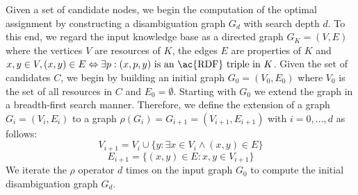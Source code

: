 Given a set of candidate nodes, we begin the computation of the optimal assignment by constructing a disambiguation graph $G_d$ with search depth $d$.
To this end, we regard the input knowledge base as a directed graph $G_K = (V, E)$ where the vertices $V$ are resources of $K$, the edges $E$ are properties of $K$ and $x,y\in V, (x,y) \in E \Leftrightarrow \exists p : (x, p, y) \mbox{ is an \ac{RDF} triple in }K$.
Given the set of candidates $C$, we begin by building an initial graph $G_0 = (V_0, E_0)$ where $V_0$ is the set of all resources in $C$ and $E_0=\emptyset$. %
Starting with $G_0$ we extend the graph in a breadth-first search manner.
Therefore, we define the extension of a graph $G_i = (V_i, E_i)$ to a graph $\rho(G_i) = G_{i+1} = (V_{i+1}, E_{i+1})$ with $i=0, \ldots, d$ as follows:
\begin{equation}
V_{i+1} = V_i \cup \{y : \exists x \in V_i \wedge (x, y) \in E\}
\end{equation}
\begin{equation}
E_{i+1} = \{(x,y) \in E: x, y \in V_{i+1}\}
\end{equation}
We iterate the $\rho$ operator $d$ times on the input graph $G_0$ to compute the initial disambiguation graph $G_d$.


